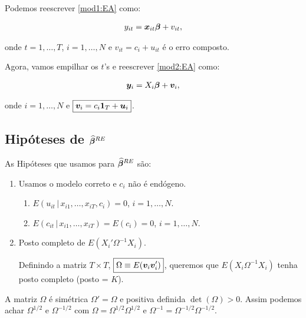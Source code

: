 \documentclass[11pt,oneside,a4paper]{article}
\numberwithin{equation}{section}
\begin{document}
Podemos reescrever \eqref{mod1:EA} como:

\vspace{-1 em}
\begin{align} \label{mod2:EA}
	y_{it} = \boldsymbol{x}_{it} \boldsymbol{\beta} + v_{it},
\end{align}

\noindent
onde
$t = 1, \dots, T$, $i = 1, \dots, N$ e $\boxed{v_{it} = c_{i} + u_{it}}$ é o erro composto.

Agora, vamos empilhar os $t$'s e reescrever \eqref{mod2:EA} como:

\vspace{-1 em}
\begin{align} \label{mod3:EA}
	\boldsymbol{y}_{i} = X_{i} \boldsymbol{\beta} + \boldsymbol{v}_{i},
\end{align}

\noindent
onde
$i = 1, \dots, N$ e $\boxed{\boldsymbol{v}_{i} = c_{i} \boldsymbol{1}_{T} + \boldsymbol{u}_{i}}$.

\subsection*{Hipóteses de $\boldsymbol{\widehat{\beta}}^{RE}$}

As Hipóteses que usamos para $\boldsymbol{\widehat{\beta}}^{RE}$ são:

\begin{enumerate} \itemsep0pt
\item  
Usamos o modelo correto e $c_{i}$ não é endógeno.

\begin{enumerate}[label =\alph*)]
\item 
	$E( u_{it} \, | \,  x_{i1}, \dots, x_{iT}, c_{i} ) = 0$,
	$i = 1, \dots, N$.
\item        
	$E( c_{it} \, | \, x_{i1}, \dots, x_{iT} ) = E( c_{i} ) = 0$,
	$i = 1, \dots, N$.
\end{enumerate}

\item  Posto completo de $E( X_{i}' \Omega^{-1} X_{i} )$.

Definindo a matriz $T \times T$, $\boxed{\Omega \equiv E(\boldsymbol{v}_{i} \boldsymbol{v}_{i}')}$, queremos que $E( X_{i} \Omega^{-1} X_{i} )$ tenha posto completo (posto = $K$).
\end{enumerate}

A matriz $\Omega$ é simétrica $\Omega' = \Omega$ e positiva definida $\det(\Omega) > 0$.
Assim podemos achar $\Omega^{1/2}$ e $\Omega^{-1/2}$ com $\Omega = \Omega^{1/2} \Omega^{1/2}$ e $\Omega^{-1} = \Omega^{-1/2} \Omega^{-1/2}$.
\end{document}
